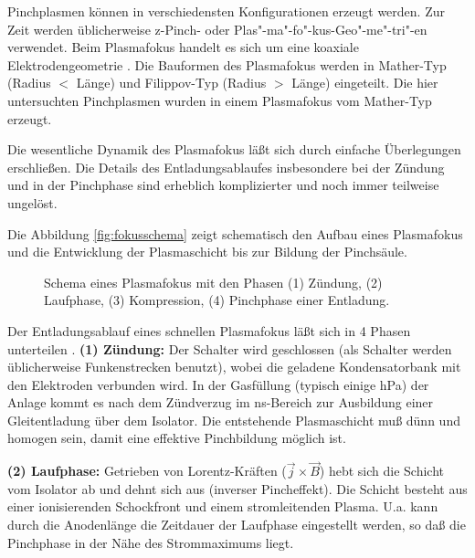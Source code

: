%
%
\label{sec:pinchplasmen}
%
Pinchplasmen können in verschiedensten Konfigurationen erzeugt
werden. Zur Zeit werden üblicherweise z-Pinch- oder
Plas"-ma"-fo"-kus-Geo"-me"-tri"-en verwendet. Beim Plasmafokus
handelt es sich um eine koaxiale Elektrodengeometrie
\cite{mather:65}. Die Bauformen des Plasmafokus werden in
Mather-Typ (Radius $<$ Länge) und Filippov-Typ (Radius $>$ Länge)
eingeteilt. Die hier untersuchten Pinchplasmen wurden in einem
Plasmafokus vom Mather-Typ erzeugt.
\par
Die wesentliche Dynamik des Plasmafokus läßt sich durch einfache
Überlegungen erschließen. Die Details des Entladungsablaufes
insbesondere bei der Zündung und in der Pinchphase sind erheblich
komplizierter und noch immer teilweise ungelöst.
\par
Die Abbildung \vref{fig:fokusschema} zeigt schematisch den Aufbau eines
Plasmafokus und  die Entwicklung der Plasmaschicht bis zur Bildung der
Pinchsäule.
%
\par
\begin{figure}[H]
  \center
  \caption{Schema eines Plasmafokus mit den Phasen (1) Zündung, (2) Laufphase,
     (3) Kompression, (4) Pinchphase einer Entladung.}
  \label{fig:fokusschema}
\end{figure}
%
\par
Der Entladungsablauf eines schnellen Plasmafokus läßt sich in 4 Phasen
unterteilen \cite{kies:phd}. {\bf (1) Zündung:} Der Schalter wird
geschlossen (als Schalter werden üblicherweise Funkenstrecken benutzt),
wobei die geladene Kondensatorbank mit den Elektroden verbunden wird.
In der Gasfüllung (typisch einige hPa) der Anlage kommt es nach dem
Zündverzug im ns-Bereich zur Ausbildung einer Gleitentladung über dem
Isolator. Die entstehende Plasmaschicht muß dünn und homogen sein,
damit eine effektive Pinchbildung möglich ist.
\par
{\bf (2) Laufphase:} Getrieben von Lorentz-Kräften
($\vec{j}\times\vec{B}$) hebt sich die Schicht vom Isolator ab und
dehnt sich aus (inverser Pincheffekt). Die Schicht besteht aus einer
ionisierenden Schockfront und einem stromleitenden Plasma. U.a. kann
durch die Anodenlänge die Zeitdauer der Laufphase eingestellt werden,
so daß die Pinchphase in der Nähe des Strommaximums liegt.
\par

